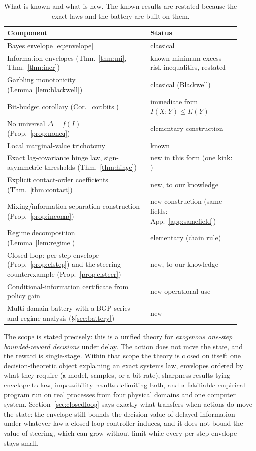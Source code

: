 \documentclass[11pt]{article}
\begin{document}
\begin{table}[!ht]\centering\small
\begin{tabular}{p{0.58\linewidth}p{0.36\linewidth}}
\toprule
Component & Status \\
\midrule
Bayes envelope \eqref{eq:envelope} & classical \cite{howard1966,raiffa61,delaragossner} \\
Information envelopes (Thm.~\ref{thm:mi}, Thm.~\ref{thm:incr}) & known minimum-excess-risk inequalities, restated \\
Garbling monotonicity (Lemma~\ref{lem:blackwell}) & classical (Blackwell) \\
Bit-budget corollary (Cor.~\ref{cor:bits}) & immediate from $I(X;Y)\le H(Y)$ \\
No universal $\Delta=f(I)$ (Prop.~\ref{prop:noneq}) & elementary construction \\
Local marginal-value trichotomy & known \cite{delaragossner} \\
Exact lag-covariance hinge law, sign-asymmetric thresholds (Thm.~\ref{thm:hinge}) & new in this form (one kink: \cite{murphy77}) \\
Explicit contact-order coefficients (Thm.~\ref{thm:contact}) & new, to our knowledge \\
Mixing/information separation construction (Prop.~\ref{prop:incomp}) & new construction (same fields: App.~\ref{app:samefield}) \\
Regime decomposition (Lemma~\ref{lem:regime}) & elementary (chain rule) \\
Closed loop: per-step envelope (Prop.~\ref{prop:clstep}) and the steering
counterexample (Prop.~\ref{prop:clsteer}) & new, to our knowledge \\
Conditional-information certificate from policy gain & new operational use \\
Multi-domain battery with a BGP series and regime analysis (\S\ref{sec:battery}) & new \\
\bottomrule
\end{tabular}
\caption{What is known and what is new. The known results are restated because the exact laws and the battery are built on them.}
\label{tab:novelty}
\end{table}

The scope is stated precisely: this is a unified theory for
\emph{exogenous one-step bounded-reward decisions} under delay. The
action does not move the state, and the reward is single-stage. Within that
scope the theory is closed on itself: one decision-theoretic object
explaining an exact systems law, envelopes ordered by what they require
(a model, samples, or a bit rate), sharpness results tying envelope to law,
impossibility results delimiting both, and a falsifiable empirical program
run on real processes from four physical domains and one computer system.
Section~\ref{sec:closedloop} says exactly what transfers when actions do move
the state: the envelope still bounds the decision value of delayed
information under whatever law a closed-loop controller induces, and it
does not bound the value of steering, which can grow without limit while
every per-step envelope stays small.
\end{document}
